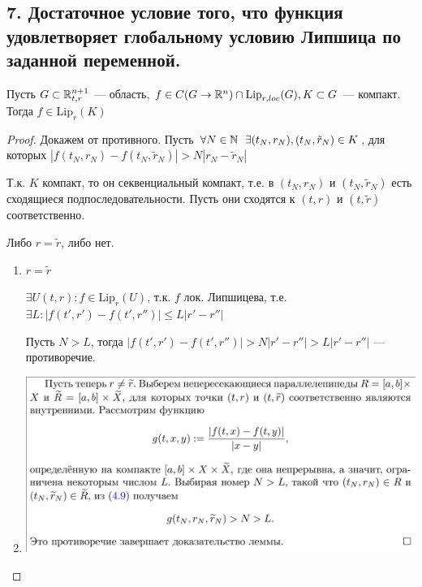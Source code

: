 \subsection*{7. Достаточное условие того, что функция удовлетворяет глобальному условию Липшица по заданной переменной.}

Пусть \(G\subset \mathbb{R}^{n + 1}_{t, r}\) --- область, \(f\in C(G \to \mathbb{R}^n)\cap \text{Lip}_{r, loc}(G), K\subset G\) --- компакт. Тогда \(f\in \text{Lip}_{r}(K)\)

\begin{proof}
    Докажем от противного. Пусть \(\forall N\in\mathbb{N} \ \ \exists (t_N, r_N), (t_N, \tilde r_N)\in K\), для которых \(|f(t_N, r_N) - f(t_N, \tilde r_N)| > N|r_N - \tilde r_N|\)

    Т.к. \(K\) компакт, то он секвенциальный компакт, т.е. в \((t_N, r_N)\) и \((t_N, \tilde r_N)\) есть сходящиеся подпоследовательности. Пусть они сходятся к \((t, r)\) и \((t, \tilde r)\) соответственно.

    Либо \(r = \tilde r\), либо нет.

    \begin{enumerate}
        \item \(r = \tilde r\)

              \(\exists U(t, r) : f\in \text{Lip}_r(U)\), т.к. \(f\) лок. Липшицева, т.е. \(\exists L : |f(t', r') - f(t', r'')| \leq L|r' - r''|\)

              Пусть \(N > L\), тогда \(|f(t', r') - f(t', r'')| > N|r' - r''| > L|r' - r''|\) --- противоречие.

        \item
              \includegraphics[scale=0.3]{images/7.png}
    \end{enumerate}
\end{proof}

